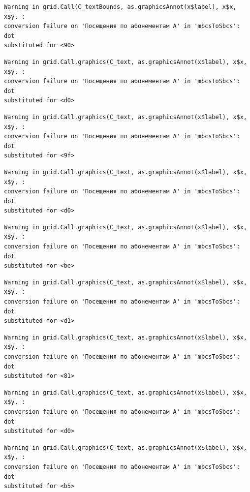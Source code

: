 \documentclass[
  letterpaper,
  DIV=11,
  numbers=noendperiod]{scrartcl}
\begin{document}
\begin{verbatim}
Warning in grid.Call(C_textBounds, as.graphicsAnnot(x$label), x$x, x$y, :
conversion failure on 'Посещения по абонементам А' in 'mbcsToSbcs': dot
substituted for <90>
\end{verbatim}

\begin{verbatim}
Warning in grid.Call.graphics(C_text, as.graphicsAnnot(x$label), x$x, x$y, :
conversion failure on 'Посещения по абонементам А' in 'mbcsToSbcs': dot
substituted for <d0>
\end{verbatim}

\begin{verbatim}
Warning in grid.Call.graphics(C_text, as.graphicsAnnot(x$label), x$x, x$y, :
conversion failure on 'Посещения по абонементам А' in 'mbcsToSbcs': dot
substituted for <9f>
\end{verbatim}

\begin{verbatim}
Warning in grid.Call.graphics(C_text, as.graphicsAnnot(x$label), x$x, x$y, :
conversion failure on 'Посещения по абонементам А' in 'mbcsToSbcs': dot
substituted for <d0>
\end{verbatim}

\begin{verbatim}
Warning in grid.Call.graphics(C_text, as.graphicsAnnot(x$label), x$x, x$y, :
conversion failure on 'Посещения по абонементам А' in 'mbcsToSbcs': dot
substituted for <be>
\end{verbatim}

\begin{verbatim}
Warning in grid.Call.graphics(C_text, as.graphicsAnnot(x$label), x$x, x$y, :
conversion failure on 'Посещения по абонементам А' in 'mbcsToSbcs': dot
substituted for <d1>
\end{verbatim}

\begin{verbatim}
Warning in grid.Call.graphics(C_text, as.graphicsAnnot(x$label), x$x, x$y, :
conversion failure on 'Посещения по абонементам А' in 'mbcsToSbcs': dot
substituted for <81>
\end{verbatim}

\begin{verbatim}
Warning in grid.Call.graphics(C_text, as.graphicsAnnot(x$label), x$x, x$y, :
conversion failure on 'Посещения по абонементам А' in 'mbcsToSbcs': dot
substituted for <d0>
\end{verbatim}

\begin{verbatim}
Warning in grid.Call.graphics(C_text, as.graphicsAnnot(x$label), x$x, x$y, :
conversion failure on 'Посещения по абонементам А' in 'mbcsToSbcs': dot
substituted for <b5>
\end{verbatim}
\end{document}
